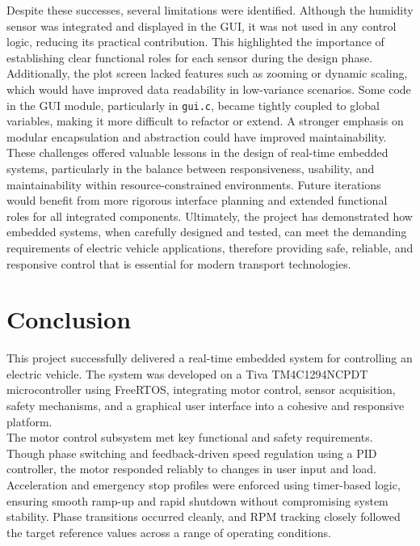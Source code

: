 \documentclass[a4paper, 11pt, titlepage]{article}
\begin{document}
Despite these successes, several limitations were identified. Although the humidity sensor was integrated and displayed in the GUI, it was not used in any control logic, reducing its practical contribution. This highlighted the importance of establishing clear functional roles for each sensor during the design phase. Additionally, the plot screen lacked features such as zooming or dynamic scaling, which would have improved data readability in low-variance scenarios. Some code in the GUI module, particularly in \verb|gui.c|, became tightly coupled to global variables, making it more difficult to refactor or extend. A stronger emphasis on modular encapsulation and abstraction could have improved maintainability.\\

These challenges offered valuable lessons in the design of real-time embedded systems, particularly in the balance between responsiveness, usability, and maintainability within resource-constrained environments. Future iterations would benefit from more rigorous interface planning and extended functional roles for all integrated components. Ultimately, the project has demonstrated how embedded systems, when carefully designed and tested, can meet the demanding requirements of electric vehicle applications, therefore providing safe, reliable, and responsive control that is essential for modern transport technologies.

\newpage

\section{Conclusion}
This project successfully delivered a real-time embedded system for controlling an electric vehicle. The system was developed on a Tiva TM4C1294NCPDT microcontroller using FreeRTOS, integrating motor control, sensor acquisition, safety mechanisms, and a graphical user interface into a cohesive and responsive platform.\\

The motor control subsystem met key functional and safety requirements. Though phase switching and feedback-driven speed regulation using a PID controller, the motor responded reliably to changes in user input and load. Acceleration and emergency stop profiles were enforced using timer-based logic, ensuring smooth ramp-up and rapid shutdown without compromising system stability. Phase transitions occurred cleanly, and RPM tracking closely followed the target reference values across a range of operating conditions. \\
\end{document}
